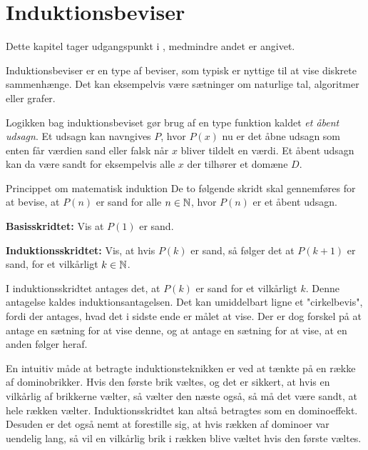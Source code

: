 \chapter{Induktionsbeviser}

Dette kapitel tager udgangspunkt i \citep{dmat}, medmindre andet er angivet.

Induktionsbeviser er en type af beviser, som typisk er nyttige til at vise diskrete sammenhænge.
Det kan eksempelvis være sætninger om naturlige tal, algoritmer eller grafer.

Logikken bag induktionsbeviset gør brug af en type funktion kaldet \textit{et åbent udsagn}.
Et udsagn kan navngives $P$, hvor $P(x)$ nu er det åbne udsagn som enten får værdien sand eller falsk når $x$ bliver tildelt en værdi.
Et åbent udsagn kan da være sandt for eksempelvis alle $x$ der tilhører et domæne $D$.

\begin{theorembox}{Princippet om matematisk induktion}
	De to følgende skridt skal gennemføres for at bevise, at $P(n)$ er sand for alle $n \in \mathbb{N}$, hvor $P(n)$ er et åbent udsagn.

	\textbf{Basisskridtet:} \quad 
	Vis at $P(1)$ er sand.
	
	\textbf{Induktionsskridtet:} \quad 
	Vis, at hvis $P(k)$ er sand, så følger det at $P(k + 1)$ er sand, for et vilkårligt $k \in \mathbb{N}$.
\end{theorembox}

I induktionsskridtet antages det, at $P(k)$ er sand for et vilkårligt $k$.
Denne antagelse kaldes induktionsantagelsen.
Det kan umiddelbart ligne et "cirkelbevis", fordi der antages, hvad det i sidste ende er målet at vise.
Der er dog forskel på at antage en sætning for at vise denne, og at antage en sætning for at vise, at en anden følger heraf.

En intuitiv måde at betragte induktionsteknikken er ved at tænkte på en række af dominobrikker.
Hvis den første brik væltes, og det er sikkert, at hvis en vilkårlig af brikkerne vælter, så vælter den næste også, så må det være sandt, at hele rækken vælter.
Induktionsskridtet kan altså betragtes som en dominoeffekt.
Desuden er det også nemt at forestille sig, at hvis rækken af dominoer var uendelig lang, så vil en vilkårlig brik i rækken blive væltet hvis den første væltes. 

